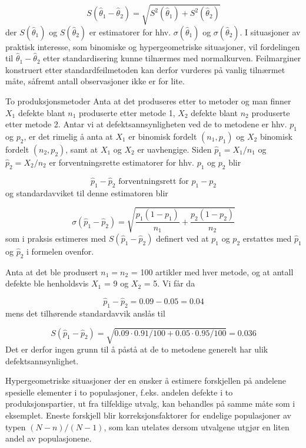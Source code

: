 \[  S({\hat{\theta}}_1-{\hat{\theta}}_2)=
       \sqrt{S^2({\hat{\theta}}_1)+S^2({\hat{\theta}}_2)} \]
der $S({\hat{\theta}}_1)$ og $S({\hat{\theta}}_2)$ er estimatorer for
hhv. $\sigma({\hat{\theta}}_1)$ og $\sigma({\hat{\theta}}_2)$.
I situasjoner av praktisk interesse, som binomiske og 
hypergeometriske situasjoner, vil fordelingen til 
${\hat{\theta}}_1 - {\hat{\theta}}_2$ etter standardisering kunne
tilnærmes med normalkurven.  Feilmarginer konstruert etter 
standardfeilmetoden kan derfor vurderes på vanlig tilnærmet 
måte, såfremt antall observasjoner ikke er for lite. \\

\begin{eksempel}{To produksjonsmetoder}
Anta at det produseres etter to metoder og man finner $X_1$ defekte
blant $n_1$ produserte etter metode 1, $X_2$ defekte blant $n_2$ 
produserte etter metode 2.  Antar vi at defektsannsynligheten ved
de to metodene er hhv. $p_1$ og $p_2$, er det rimelig å anta at
$X_1$ er binomisk fordelt $(n_1, p_1)$ og $X_2$ binomisk fordelt
$(n_2, p_2)$, samt at $X_1$ og $X_2$ er uavhengige.  Siden 
${\hat{p}}_1 = X_1/n_1$ og ${\hat{p}}_2 = X_2/n_2$ er 
forventningsrette estimatorer for hhv. $p_1$ og $p_2$ blir 

\[{\hat{p}}_1 - {\hat{p}}_2 \mbox{\ \ forventningsrett for\ \  } p_1 - p_2 \]
og standardavviket til denne estimatoren blir

\[ \sigma ({\hat{p}}_1-{\hat{p}}_2)=
          \sqrt{\frac{p_1(1-p_1)}{n_1}+\frac{p_2(1-p_2)}{n_2}} \]
som i praksis estimeres med $S({\hat{p}_1} - {\hat{p}}_2)$ definert 
ved at $p_1$ og $p_2$ erstattes med ${\hat{p}}_1$ og ${\hat{p}}_2$
i formelen ovenfor.  

Anta at det ble produsert $n_1 = n_2$ = 100 artikler med hver metode,
og at antall defekte ble henholdsvis $X_1$ = 9 og $X_2$ = 5.
Vi får da

\[  {\hat{p}}_1 - {\hat{p}}_2 = 0.09 - 0.05 = 0.04   \]
mens det tilhørende standardavvik anslås til 

\[ S({\hat{p}}_1-{\hat{p}}_2)= \sqrt{0.09\cdot 0.91/100+0.05\cdot
0.95/100}=0.036 \]
Det er derfor ingen grunn til å påstå at de to metodene 
generelt har ulik defektsannsynlighet.
\end{eksempel}

Hypergeometriske situasjoner der en ønsker å estimere 
forskjellen på andelene spesielle elementer i to populasjoner,
f.eks. andelen defekte i to produksjonspartier, ut fra tilfeldige 
utvalg, kan behandles på samme måte som i eksemplet.  Eneste
forskjell blir korreksjonsfaktorer for endelige po\-pula\-sjoner av typen
$(N-n)/(N-1)$, som kan utelates dersom utvalgene utgjør en liten 
andel av populasjonene.

